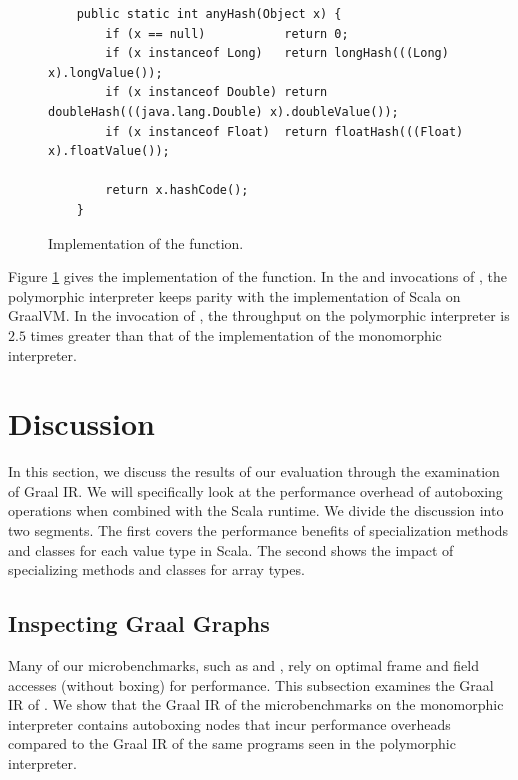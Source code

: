 \begin{figure}[!htb]
\begin{verbatim}
	public static int anyHash(Object x) {
		if (x == null)           return 0;
		if (x instanceof Long)   return longHash(((Long) x).longValue());
		if (x instanceof Double) return doubleHash(((java.lang.Double) x).doubleValue());
		if (x instanceof Float)  return floatHash(((Float) x).floatValue());
		
		return x.hashCode();
	}
\end{verbatim}
\caption{Implementation of the  function.}
\label{impl:anyHash}
\end{figure}


Figure \ref{impl:anyHash} gives the implementation of the  function.
In the  and  invocations of , the polymorphic interpreter keeps parity with the implementation of Scala on GraalVM.
In the  invocation of , the throughput on the polymorphic interpreter is $2.5$ times greater than that of the implementation of the monomorphic interpreter.

\section{Discussion}

In this section, we discuss the results of our evaluation through the examination of Graal IR.
We will specifically look at the performance overhead of autoboxing operations when combined with the Scala runtime.
We divide the discussion into two segments.
The first covers the performance benefits of specialization methods and classes for each value type in Scala.
The second shows the impact of specializing methods and classes for array types.

\subsection{Inspecting Graal Graphs}

Many of our microbenchmarks, such as  and , rely on optimal frame and field accesses (without boxing) for performance.
This subsection examines the Graal IR of .
We show that the Graal IR of the microbenchmarks on the monomorphic interpreter contains autoboxing nodes that incur performance overheads compared to the Graal IR of the same programs seen in the polymorphic interpreter.

